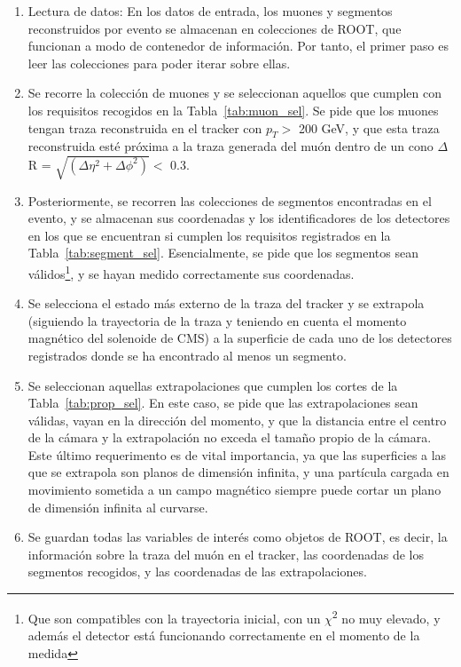 \begin{enumerate}
\item Lectura de datos: En los datos de entrada, los muones y segmentos reconstruidos por evento se almacenan en colecciones de ROOT, que funcionan a modo de contenedor de informaci\'on. Por tanto, el primer paso es leer las colecciones para poder iterar sobre ellas. 
\item Se recorre la colecci\'on de muones y se seleccionan aquellos que cumplen con los requisitos recogidos en la Tabla~\ref{tab:muon_sel}. Se pide que los muones tengan traza reconstruida en el tracker con $p_{T} >$ 200 GeV, y que esta traza reconstruida est\'e pr\'oxima a la traza generada del mu\'on dentro de un cono $\Delta$R = $\sqrt{(\Delta\eta^{2}+\Delta\phi^{2})} <$  0.3.
\item Posteriormente, se recorren las colecciones de segmentos encontradas en el evento, y se almacenan sus coordenadas y los identificadores de los detectores en los que se encuentran si cumplen los requisitos registrados en la Tabla~\ref{tab:segment_sel}. Esencialmente, se pide que los segmentos sean v\'alidos\footnote{Que son compatibles con la trayectoria inicial, con un $\chi$\textsuperscript{2} no muy elevado, y adem\'as el detector est\'a funcionando correctamente en el momento de la medida}, y se hayan medido correctamente sus coordenadas.
\item Se selecciona el estado m\'as externo de la traza del tracker y se extrapola (siguiendo la trayectoria de la traza y teniendo en cuenta el momento magn\'etico del solenoide de CMS) a la superficie de cada uno de los detectores registrados donde se ha encontrado al menos un segmento.
\item Se seleccionan aquellas extrapolaciones que cumplen los cortes de la Tabla~\ref{tab:prop_sel}. En este caso, se pide que las extrapolaciones sean v\'alidas, vayan en la direcci\'on del momento, y que la distancia entre el centro de la c\'amara y la extrapolaci\'on no exceda el tama\~no propio de la c\'amara. Este \'ultimo requerimento es de vital importancia, ya que las superficies a las que se extrapola son planos de dimensi\'on infinita, y una part\'icula cargada en movimiento sometida a un campo magn\'etico siempre puede cortar un plano de dimensi\'on infinita al curvarse.
\item Se guardan todas las variables de inter\'es como objetos de ROOT, es decir, la informaci\'on sobre la traza del mu\'on en el tracker, las coordenadas de los segmentos recogidos, y las coordenadas de las extrapolaciones.
\end{enumerate}

